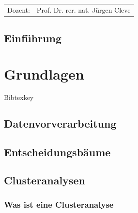 \documentclass[12pt,					%
							 oneside,			%
							 a4paper,			%
							 halfparskip,		%
							 liststotoc,			%
							 bibtotoc,			%
							 fleqn,				%
							 pointlessnumbers]	%
							 {scrreprt}
\newcommand{\Betreuer}{Prof. Dr. rer. nat. Jürgen Cleve}
\newcommand{\blankpage}{
	\newpage
}
\begin{document}
\begin{titlepage}
\begin{center}
\begin{table}[b]
\begin{tabular}{rl}
					Dozent: & \Betreuer \\

				\end{tabular}
			\end{table}
		\end{center}
	\end{titlepage}

	\onehalfspacing 					%
	

	
\section*{Einführung}


\newpage

\tableofcontents 					%
	
\chapter{Grundlagen}

Bibtexkey\cite{Cleve2020}
\section{Datenvorverarbeitung}
\section{Entscheidungsbäume}

\section{Clusteranalysen}
\subsection{Was ist eine Clusteranalyse}
\end{document}

